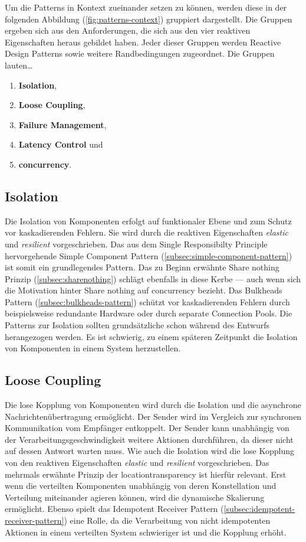 Um die Patterns in Kontext zueinander setzen zu können, werden diese in der folgenden Abbildung (\ref{fig:patterns-context}) gruppiert dargestellt. Die Gruppen ergeben sich aus den Anforderungen, die sich aus den vier reaktiven Eigenschaften heraus gebildet haben. Jeder dieser Gruppen werden Reactive Design Patterns sowie weitere Randbedingungen zugeordnet. Die Gruppen lauten\ldots

\begin{enumerate}
  \item \textbf{Isolation},
  \item \textbf{Loose Coupling},
  \item \textbf{Failure Management},
  \item \textbf{Latency Control} und
  \item \textbf{\gls{concurrency}}.
\end{enumerate}

\pagebreak

\subsection{Isolation}
Die Isolation von Komponenten erfolgt auf funktionaler Ebene und zum Schutz vor kaskadierenden Fehlern. Sie wird durch die reaktiven Eigenschaften \textit{elastic} und \textit{resilient} vorgeschrieben. Das aus dem Single Responsibilty Principle hervorgehende Simple Component Pattern (\ref{subsec:simple-component-pattern}) ist somit ein grundlegendes Pattern. Das zu Beginn erwähnte Share nothing Prinzip (\ref{subsec:sharenothing}) schlägt ebenfalls in diese Kerbe --- auch wenn sich die Motivation hinter Share nothing auf \gls{concurrency} bezieht. Das Bulkheads Pattern (\ref{subsec:bulkheads-pattern}) schützt vor kaskadierenden Fehlern durch beispielsweise redundante Hardware oder durch separate Connection Pools. Die Patterns zur Isolation sollten grundsätzliche schon während des Entwurfs herangezogen werden. Es ist schwierig, zu einem späteren Zeitpunkt die Isolation von Komponenten in einem System herzustellen.

\subsection{Loose Coupling}
Die lose Kopplung von Komponenten wird durch die Isolation und die asynchrone Nachrichtenübertragung ermöglicht. Der Sender wird im Vergleich zur synchronen Kommunikation vom Empfänger entkoppelt. Der Sender kann unabhängig von der Verarbeitungsgeschwindigkeit weitere Aktionen durchführen, da dieser nicht auf dessen Antwort warten muss. Wie auch die Isolation wird die lose Kopplung von den reaktiven Eigenschaften \textit{elastic} und \textit{resilient} vorgeschrieben. Das mehrmals erwähnte Prinzip der \gls{locationtransparency} ist hierfür relevant. Erst wenn die verteilten Komponenten unabhängig von deren Konstellation und Verteilung miteinander agieren können, wird die dynamische Skalierung ermöglicht. Ebenso spielt das Idempotent Receiver Pattern (\ref{subsec:idempotent-receiver-pattern}) eine Rolle, da die Verarbeitung von nicht idempotenten Aktionen in einem verteilten System schwieriger ist und die Kopplung erhöht.

